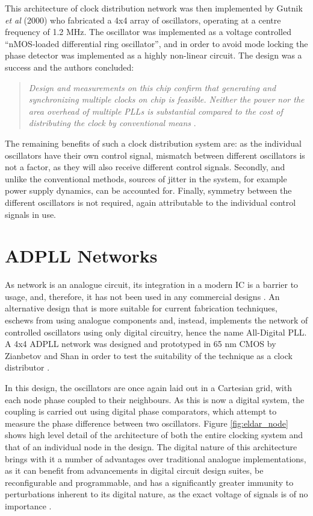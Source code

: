This architecture of clock distribution network was then implemented by Gutnik \textit{et al} (2000) who fabricated a 4x4 array of oscillators, operating at a centre frequency of 1.2 MHz. The oscillator was implemented as a voltage controlled ``nMOS-loaded differential ring oscillator'', and in order to avoid mode locking the phase detector was implemented as a highly non-linear circuit. The design was a success and the authors concluded:
\begin{quote}
	\textit{Design and measurements on this chip confirm that generating and synchronizing multiple clocks on chip is feasible. Neither the power nor the area overhead of multiple \acsp{PLL} is substantial compared to the cost of distributing the clock by conventional means} \cite{gutnik2000active}.
\end{quote}

The remaining benefits of such a clock distribution system are: as the individual oscillators have their own control signal, mismatch between different oscillators is not a factor, as they will also receive different control signals. Secondly, and unlike the conventional methods, sources of jitter in the system, for example power supply dynamics, can be accounted for. Finally, symmetry between the different oscillators is not required, again attributable to the individual control signals in use. 

\section{ADPLL Networks}
As  network is an analogue circuit, its integration in a modern \ac{IC} is a barrier to usage, and, therefore, it has not been used in any commercial designs \cite{zianbetov2013distributed}. An alternative design that is more suitable for current fabrication techniques, eschews from using analogue components and, instead, implements the network of controlled oscillators using only digital circuitry, hence the name All-Digital \ac{PLL}. A 4x4 \ac{ADPLL} network was designed and prototyped in 65 nm CMOS by Zianbetov and Shan in order to test the suitability of the technique as a clock distributor \cite{zianbetov2013phd,shan2014phd}.

In this design, the oscillators are once again laid out in a Cartesian grid, with each node phase coupled to their neighbours. As this is now a digital system, the coupling is carried out using digital phase comparators, which attempt to measure the phase difference between two oscillators. Figure \ref{fig:eldar_node} shows high level detail of the architecture of both the entire clocking system and that of an individual node in the design. The digital nature of this architecture brings with it a number of advantages over traditional analogue implementations, as it can benefit from advancements in digital circuit design suites, be reconfigurable and programmable, and has a significantly greater immunity to perturbations inherent to its digital nature, as the exact voltage of signals is of no importance \cite{zianbetov2013phd}. 

